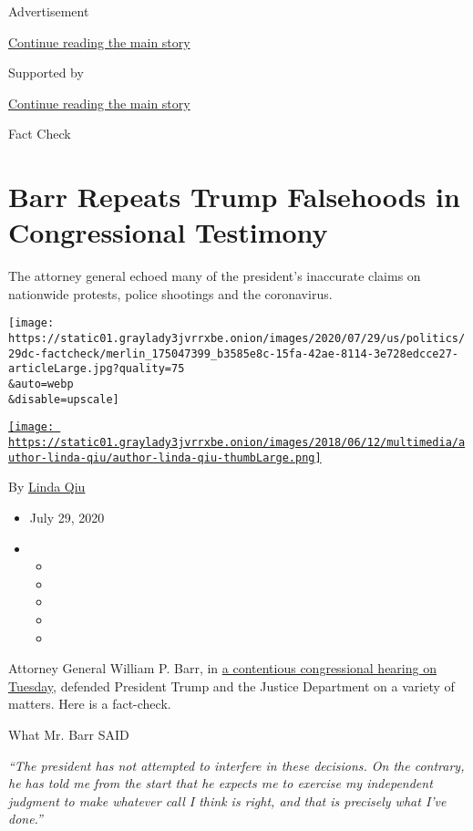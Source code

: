 Advertisement

\protect\hyperlink{after-top}{Continue reading the main story}

Supported by

\protect\hyperlink{after-sponsor}{Continue reading the main story}

Fact Check

\hypertarget{barr-repeats-trump-falsehoods-in-congressional-testimony}{%
\section{Barr Repeats Trump Falsehoods in Congressional
Testimony}\label{barr-repeats-trump-falsehoods-in-congressional-testimony}}

The attorney general echoed many of the president's inaccurate claims on
nationwide protests, police shootings and the coronavirus.

\texttt{[image: https://static01.graylady3jvrrxbe.onion/images/2020/07/29/us/politics/29dc-factcheck/merlin\_175047399\_b3585e8c-15fa-42ae-8114-3e728edcce27-articleLarge.jpg?quality=75\\\&auto=webp\\\&disable=upscale]}

\href{https://www.nytimes3xbfgragh.onion/by/linda-qiu}{\texttt{[image: https://static01.graylady3jvrrxbe.onion/images/2018/06/12/multimedia/author-linda-qiu/author-linda-qiu-thumbLarge.png]}}

By \href{https://www.nytimes3xbfgragh.onion/by/linda-qiu}{Linda Qiu}

\begin{itemize}
\item
  July 29, 2020
\item
  \begin{itemize}
  \item
  \item
  \item
  \item
  \item
  \end{itemize}
\end{itemize}

Attorney General William P. Barr, in
\href{https://www.nytimes3xbfgragh.onion/2020/07/28/us/politics/barr-testimony.html}{a
contentious congressional hearing on Tuesday}, defended President Trump
and the Justice Department on a variety of matters. Here is a
fact-check.

What Mr. Barr SAID

\emph{``The president has not attempted to interfere in these decisions.
On the contrary, he has told me from the start that he expects me to
exercise my independent judgment to make whatever call I think is right,
and that is precisely what I've done.''}

